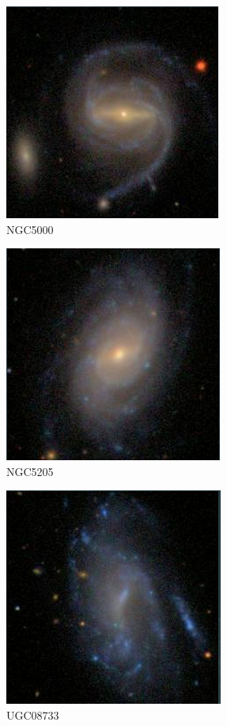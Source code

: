 \documentclass[9pt]{revtex4-1}
\begin{document}
\begin{figure}
\includegraphics[scale=0.3]{NGC5000.png}
\caption{NGC5000}
\end{figure}
\begin{figure}
\includegraphics[scale=0.3]{NGC5205.png}
\caption{NGC5205}
\end{figure}
\begin{figure}
\includegraphics[scale=0.3]{UGC08733.png}
\caption{UGC08733}
\end{figure}
\end{document}
